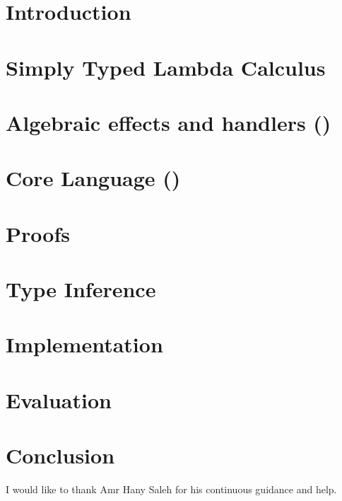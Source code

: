 \documentclass[acmsmall,10pt]{acmart}\settopmatter{printfolios=true}
\begin{document}
\tableofcontents

\listoffigures
\listoftables

\section{Introduction}


\section{Simply Typed Lambda Calculus}


\section{Algebraic effects and handlers (\eff)}




\section{Core Language (\core)}







\section{Proofs}


\section{Type Inference}






\section{Implementation}


\section{Evaluation}


\section{Conclusion}


\appendix

\begin{acks}
  I would like to thank Amr Hany Saleh for his continuous guidance and help.
\end{acks}


\nocite{*}
\end{document}
